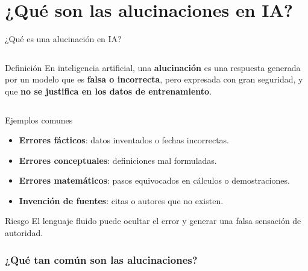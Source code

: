 \section{¿Qué son las alucinaciones en IA?}

\begin{frame}[t]{¿Qué es una alucinación en IA?}

\vspace{-9mm}
\begin{columns}
\begin{block}{Definición}
    En inteligencia artificial, una \textbf{alucinación} es una respuesta generada por un modelo que es \textbf{falsa o incorrecta}, pero expresada con gran seguridad, y que \textbf{no se justifica en los datos de entrenamiento}.
\end{block}
\end{columns}
\end{frame}



\begin{frame}
\begin{block}{Ejemplos comunes}
\begin{itemize}
    \item \textbf{Errores fácticos}: datos inventados o fechas incorrectas.
    \item \textbf{Errores conceptuales}: definiciones mal formuladas.
    \item \textbf{Errores matemáticos}: pasos equivocados en cálculos o demostraciones.
    \item \textbf{Invención de fuentes}: citas o autores que no existen.
\end{itemize}
\end{block}

\vspace{0.3cm}
\pause
\begin{block}{Riesgo}
El lenguaje fluido puede ocultar el error y generar una falsa sensación de autoridad.
\end{block}
\end{frame}

\begin{frame}
    \frametitle{¿Qué tan común son las alucinaciones?}
    \centering
\end{frame}


